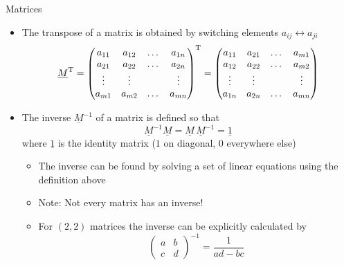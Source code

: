   \begin{frame}[fragile]{Matrices}
    \begin{itemize}
      \item The transpose of a matrix is obtained by switching
        elements $a_{ij}\leftrightarrow a_{ji}$
        \begin{equation*}
          \underline{M}^{\text{T}} =
          \begin{pmatrix}
            a_{11} & a_{12} & \dots & a_{1n} \\
            a_{21} & a_{22} & \dots & a_{2n} \\
            \vdots & \vdots &  & \vdots \\
            a_{m1} & a_{m2} & \dots & a_{mn} \\
          \end{pmatrix}^{\text{T}} =
          \begin{pmatrix}
            a_{11} & a_{21} & \dots & a_{m1} \\
            a_{12} & a_{22} & \dots & a_{m2} \\
            \vdots & \vdots &  & \vdots \\
            a_{1n} & a_{2n} & \dots & a_{mn} \\
          \end{pmatrix}
        \end{equation*}
      \item The inverse $\underline{M}^{-1}$ of a matrix is defined so that
        \begin{equation*}
          \underline{M}^{-1}\underline{M} =
          \underline{M}\,\underline{M}^{-1} = \underline{1}
        \end{equation*}
        where $\underline{1}$ is the identity matrix
        ($1$ on diagonal, $0$ everywhere else)
        \begin{itemize}
          \item The inverse can be found by solving a set of linear equations
            using the definition above
          \item Note: Not every matrix has an inverse!
          \item For $(2,2)$ matrices the inverse can be explicitly calculated by
            \begin{equation*}
              \begin{pmatrix} a & b \\ c & d \end{pmatrix}^{-1} =
              \frac{1}{ad-bc}

\end{equation*}
\end{itemize}
\end{itemize}
\end{frame}

